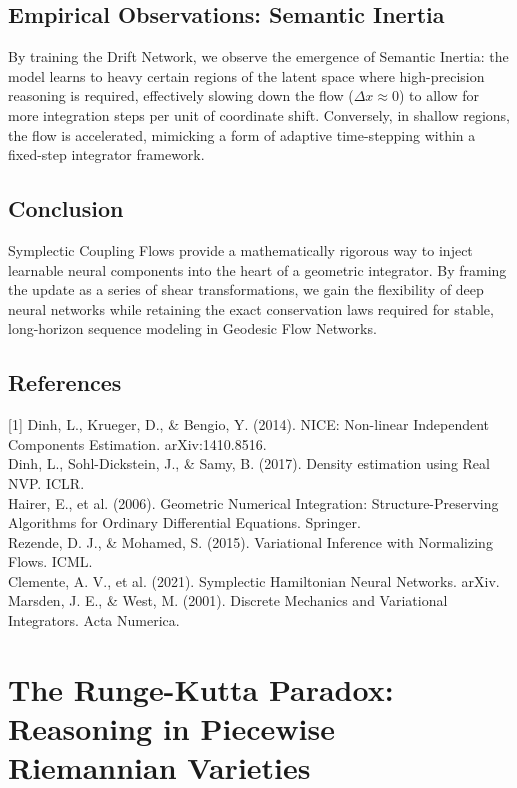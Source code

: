 \documentclass{article}
\numberwithin{equation}{section}
\begin{document}
\subsection{Empirical Observations: Semantic Inertia}
By training the Drift Network, we observe the emergence of Semantic Inertia: the model learns to heavy certain regions of the latent space where high-precision reasoning is required, effectively slowing down the flow ($\Delta x \approx 0$) to allow for more integration steps per unit of coordinate shift. Conversely, in shallow regions, the flow is accelerated, mimicking a form of adaptive time-stepping within a fixed-step integrator framework.

\subsection{Conclusion}
Symplectic Coupling Flows provide a mathematically rigorous way to inject learnable neural components into the heart of a geometric integrator. By framing the update as a series of shear transformations, we gain the flexibility of deep neural networks while retaining the exact conservation laws required for stable, long-horizon sequence modeling in Geodesic Flow Networks.

\subsection*{References}
[1] Dinh, L., Krueger, D., \& Bengio, Y. (2014). NICE: Non-linear Independent Components Estimation. arXiv:1410.8516.\\
[2] Dinh, L., Sohl-Dickstein, J., \& Samy, B. (2017). Density estimation using Real NVP. ICLR.\\
[3] Hairer, E., et al. (2006). Geometric Numerical Integration: Structure-Preserving Algorithms for Ordinary Differential Equations. Springer.\\
[4] Rezende, D. J., \& Mohamed, S. (2015). Variational Inference with Normalizing Flows. ICML.\\
[5] Clemente, A. V., et al. (2021). Symplectic Hamiltonian Neural Networks. arXiv.\\
[6] Marsden, J. E., \& West, M. (2001). Discrete Mechanics and Variational Integrators. Acta Numerica.

\section{The Runge-Kutta Paradox: Reasoning in Piecewise Riemannian Varieties}
\end{document}
